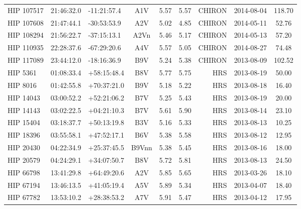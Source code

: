\begin{scriptsize}
\begin{longtable}{lllcccrcc}
  HIP 107517 &  21:46:32.0 &  -11:21:57.4 &            A1V &     5.57 &     5.57 &     CHIRON &  2014-08-04 &          118.70 \\
  HIP 107608 &  21:47:44.1 &  -30:53:53.9 &            A2V &     5.02 &     4.85 &     CHIRON &  2014-05-11 &           52.76 \\
  HIP 108294 &  21:56:22.7 &  -37:15:13.1 &           A2Vn &     5.46 &     5.17 &     CHIRON &  2014-05-13 &           57.20 \\
  HIP 110935 &  22:28:37.6 &  -67:29:20.6 &            A4V &     5.57 &     5.05 &     CHIRON &  2014-08-27 &           74.48 \\
  HIP 117089 &  23:44:12.0 &  -18:16:36.9 &            B9V &     5.24 &     5.38 &     CHIRON &  2013-08-09 &          102.52 \\
    HIP 5361 &  01:08:33.4 &  +58:15:48.4 &            B8V &     5.77 &     5.75 &        HRS &  2013-08-19 &           50.00 \\
    HIP 8016 &  01:42:55.8 &  +70:37:21.0 &            B9V &     5.18 &     5.22 &        HRS &  2013-08-18 &           16.40 \\
   HIP 14043 &  03:00:52.2 &  +52:21:06.2 &            B7V &     5.25 &     5.43 &        HRS &  2013-08-19 &           20.00 \\
   HIP 14143 &  03:02:22.5 &  +04:21:10.3 &            B7V &     5.61 &     5.90 &        HRS &  2013-08-14 &           23.10 \\
   HIP 15404 &  03:18:37.7 &  +50:13:19.8 &            B3V &     5.16 &     5.33 &        HRS &  2013-08-13 &           10.25 \\
   HIP 18396 &  03:55:58.1 &  +47:52:17.1 &            B6V &     5.38 &     5.58 &        HRS &  2013-08-12 &           12.95 \\
   HIP 20430 &  04:22:34.9 &  +25:37:45.5 &          B9Vnn &     5.38 &     5.45 &        HRS &  2013-08-16 &           18.00 \\
   HIP 20579 &  04:24:29.1 &  +34:07:50.7 &            B8V &     5.72 &     5.81 &        HRS &  2013-08-13 &           24.50 \\
   HIP 66798 &  13:41:29.8 &  +64:49:20.6 &            A2V &     5.85 &     5.65 &        HRS &  2013-03-26 &           18.10 \\
   HIP 67194 &  13:46:13.5 &  +41:05:19.4 &            A5V &     5.89 &     5.34 &        HRS &  2013-04-07 &           18.40 \\
   HIP 67782 &  13:53:10.2 &  +28:38:53.2 &            A7V &     5.91 &     5.47 &        HRS &  2013-04-12 &           17.95 \\

\end{longtable}
\end{scriptsize}

